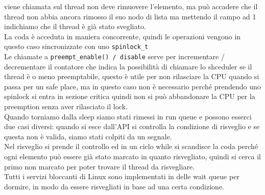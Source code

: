 \documentclass[12pt, oneside]{extbook}
\begin{document}
viene chiamata sul thread non deve rimuovere l'elemento, ma può accadere che il thread non abbia ancora rimosso il suo nodo di lista ma mettendo il campo ad 1 indichiamo che il thread è già stato svegliato.\\La coda è acceduta in maniera concorrente, quindi le operazioni vengono in questo caso sincronizzate con uno \texttt{spinlock\_t}\\Le chiamate a \texttt{preempt\_enable() / disable} serve per incrementare / decrementare il contatore che indica la possibilità di chiamare lo shceduler se il thread è o meno preemptabile, questo è utile per non rilasciare la CPU quando si passa per un safe place, ma in questo caso non è necessario perché prendendo uno spinlock si entra in sezione critica quindi non si può abbandonare la CPU per la preemption senza aver rilasciato il lock.\\Quando torniamo dalla sleep siamo stati rimessi in run queue e possono esserci due casi diversi: quando si esce dall'API si controlla la condizione di risveglio e se questa non è valida, siamo stati colpiti da un segnale.\\Nel risveglio si prende il controllo ed in un ciclo while si scandisce la coda perché ogni elemento può essere già stato marcato in quanto risvegliato, quindi si cerca il primo non marcato per poter trovare il thread da risvegliare.\\Tutti i servizi bloccanti di Linux sono implementati in delle wait queue per dormire, in modo da essere risvegliati in base ad una certa condizione.
\end{document}
